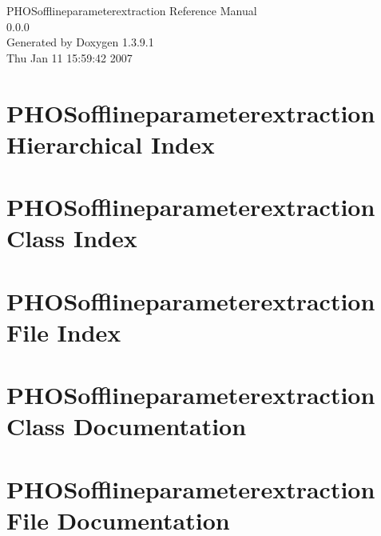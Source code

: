 \documentclass[a4paper]{book}
\begin{document}
\begin{titlepage}
\vspace*{7cm}
\begin{center}
{\Large PHOSofflineparameterextraction Reference Manual\\[1ex]\large 0.0.0 }\\
\vspace*{1cm}
{\large Generated by Doxygen 1.3.9.1}\\
\vspace*{0.5cm}
{\small Thu Jan 11 15:59:42 2007}\\
\end{center}
\end{titlepage}
\clearemptydoublepage
{}
\tableofcontents
\clearemptydoublepage
{}
\chapter{PHOSofflineparameterextraction Hierarchical Index}

\chapter{PHOSofflineparameterextraction Class Index}

\chapter{PHOSofflineparameterextraction File Index}

\chapter{PHOSofflineparameterextraction Class Documentation}






\chapter{PHOSofflineparameterextraction File Documentation}















\printindex
\end{document}
